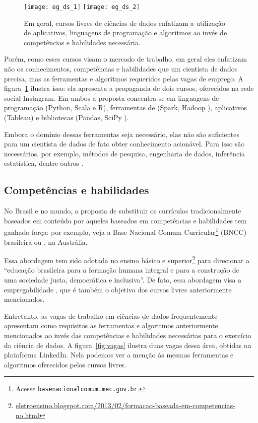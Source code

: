 \begin{figure}
	\centering

	\texttt{[image: eg\_ds\_1]}\hfill
	\texttt{[image: eg\_ds\_2]}

	\caption{Em geral, cursos livres de ciências de dados enfatizam a utilização de aplicativos, linguagens de programação e algoritmos ao invés de competências e habilidades necessária.}
	\label{fig:cursos}
\end{figure}

Porém, como esses cursos visam o mercado de trabalho, em geral eles enfatizam não os conhecimentos, competências e habilidades que um cientista de dados precisa, mas as ferramentas e algoritmos requeridos pelas vagas de emprego.
A figura~\ref{fig:cursos} ilustra isso: ela apresenta a propaganda de dois cursos, oferecidos na rede social Instagram.
Em ambos a proposta concentra-se em linguagens de programação (Python, Scala e R), ferramentas de  (Spark, Hadoop \etc), aplicativos (Tableau) e bibliotecas (Pandas, SciPy \etc).

Embora o domínio dessas ferramentas seja necessário, elas não são suficientes para um cientista de dados de fato obter conhecimento acionável.
Para isso são necessários, por exemplo, métodos de pesquisa, engenharia de dados, inferência estatística, dentre outros \cite[p.~15]{CF-DS-Release2019}.

\subsection{Competências e habilidades}

No Brasil e no mundo, a proposta de substituir os currículos tradicionalmente baseados em conteúdo por aqueles baseados em competências e habilidades tem ganhado força: por exemplo, veja a Base Nacional Comum Curricular\footnote{Acesse \texttt{basenacionalcomum.mec.gov.br}.} (BNCC) brasileira ou \cite{Inkson2017}, na Austrália.

Essa abordagem tem sido adotada no ensino básico \cite{Avila2017} e superior\footnote{\url{eletroensino.blogspot.com/2013/02/formacao-baseada-em-competencias-no.html}} para direcionar a ``educação brasileira para a formação humana integral e para a construção de uma sociedade justa, democrática e inclusiva''.
De fato, essa abordagem visa a empregabilidade \cite{Voorhees2001}, que é também o objetivo dos cursos livres anteriormente mencionados.


Entretanto, as vagas de trabalho em ciências de dados frequentemente apresentam como requisitos as ferramentas e algoritmos anteriormente mencionados ao invés das competências e habilidades necessárias para o exercício da ciência de dados.
A figura~\ref{fig:vagas} ilustra duas vagas dessa área, obtidas na plataforma LinkedIn.
Nela podemos ver a menção às mesmas ferramentas e algoritmos oferecidos pelos cursos livres.

